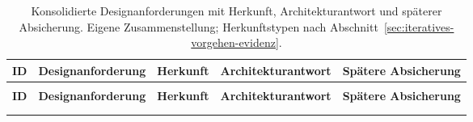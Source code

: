 \begingroup
\scriptsize
\setlength{\tabcolsep}{3pt}
\renewcommand{\arraystretch}{1.2}
\begin{xltabular}{\textwidth}{
    >{\raggedright\arraybackslash}p{0.045\textwidth}
    >{\raggedright\arraybackslash}p{0.21\textwidth}
    >{\raggedright\arraybackslash}p{0.17\textwidth}
    >{\raggedright\arraybackslash}X
    >{\raggedright\arraybackslash}p{0.17\textwidth}
}
\caption[Konsolidierte Designanforderungen A1--A10]{Konsolidierte
Designanforderungen mit Herkunft, Architekturantwort und späterer
Absicherung. Eigene Zusammenstellung; Herkunftstypen nach
Abschnitt~\ref{sec:iteratives-vorgehen-evidenz}.}
\label{t:designanforderungen-a1-a10}\\
\toprule
\textbf{ID} & \textbf{Designanforderung} & \textbf{Herkunft} &
\textbf{Architekturantwort} & \textbf{Spätere Absicherung} \\
\midrule
\endfirsthead
{}\\
\addlinespace[0.2em]
\toprule
\textbf{ID} & \textbf{Designanforderung} & \textbf{Herkunft} &
\textbf{Architekturantwort} & \textbf{Spätere Absicherung} \\
\midrule
\endhead
\midrule
{}\\
\endfoot
\bottomrule
\endlastfoot


\end{xltabular}
